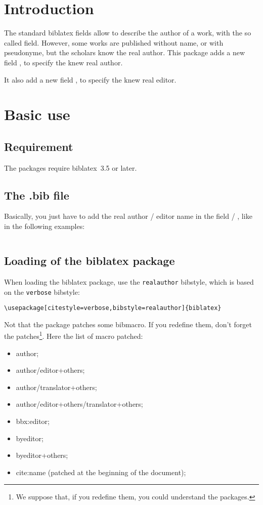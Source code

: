 \documentclass{ltxdockit}[2011/03/25]
\newcommand{\biblatex}{biblatex\xspace}
\newcommand{\namebibstyle}[1]{\texttt{#1}}
\begin{document}
\printtitlepage
\tableofcontents
\section{Introduction}

The standard biblatex fields allow to describe the author of a work, with the so called  field. However, some works are published without name, or with pseudonyme, but the scholars know the real author. This package adds a new field , to specify the knew real author.

It also add a new field , to specify the knew real editor.

\section{Basic use}

\subsection{Requirement}

The packages require \biblatex~3.5 or later.

\subsection{The .bib file}
Basically, you just have to add the real author / editor name in the field  / , like in the following examples: 

\inputminted{tex}{example-realauthor.bib}

\subsection{Loading of the \biblatex package}

When loading the \biblatex package, use the \namebibstyle{realauthor}  bibstyle, which is based on the \namebibstyle{verbose} bibstyle:

\begin{verbatim}
\usepackage[citestyle=verbose,bibstyle=realauthor]{biblatex}
\end{verbatim}

Not that the package patches some bibmacro.
If you redefine them, don't forget the patches\footnote{We suppose that, if you redefine them, you could understand the packages.}.
Here the list of macro patched:
\begin{itemize}
  \item author;
  \item author/editor+others;
  \item author/translator+others;
  \item author/editor+others/translator+others;
  \item bbx:editor;
  \item byeditor;
  \item byeditor+others;
  \item cite:name (patched at the beginning of the document);
\end{itemize}
\end{document}
